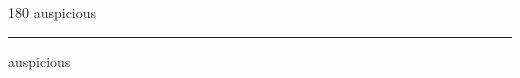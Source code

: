
\begin{frame}
\begin{center}
\begin{turn}{180}
{\fontsize{2.5cm}{1em}\selectfont auspicious}
\end{turn}
\vspace{1em}\par  
\hrule
\vspace{1em}\par  
{\fontsize{2.5cm}{1em}\selectfont auspicious}
\end{center}
\end{frame}
